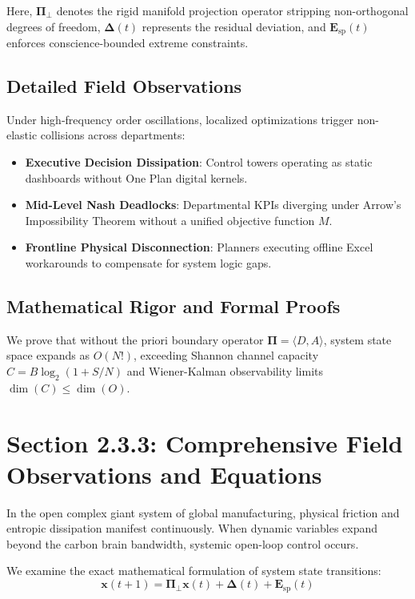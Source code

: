 \documentclass[12pt,a4paper,oneside]{book}
\begin{document}
Here, $\mathbf{\Pi}_{\bot}$ denotes the rigid manifold projection operator stripping non-orthogonal degrees of freedom, $\mathbf{\Delta}(t)$ represents the residual deviation, and $\mathbf{E}_{\mathrm{sp}}(t)$ enforces conscience-bounded extreme constraints.

\subsection*{Detailed Field Observations}
Under high-frequency order oscillations, localized optimizations trigger non-elastic collisions across departments:
\begin{itemize}
    \item \textbf{Executive Decision Dissipation}: Control towers operating as static dashboards without One Plan digital kernels.
    \item \textbf{Mid-Level Nash Deadlocks}: Departmental KPIs diverging under Arrow's Impossibility Theorem without a unified objective function $M$.
    \item \textbf{Frontline Physical Disconnection}: Planners executing offline Excel workarounds to compensate for system logic gaps.
\end{itemize}

\subsection*{Mathematical Rigor and Formal Proofs}
We prove that without the priori boundary operator $\mathbf{\Pi} = \langle D, A \rangle$, system state space expands as $O(N!)$, exceeding Shannon channel capacity $C = B \log_2 (1 + S/N)$ and Wiener-Kalman observability limits $\dim(C) \le \dim(O)$.
\clearpage
\section{Section 2.3.3: Comprehensive Field Observations and Equations}

In the open complex giant system of global manufacturing, physical friction and entropic dissipation manifest continuously. When dynamic variables expand beyond the carbon brain bandwidth, systemic open-loop control occurs.

We examine the exact mathematical formulation of system state transitions:
\begin{equation}
\mathbf{x}(t+1) = \mathbf{\Pi}_{\bot} \mathbf{x}(t) + \mathbf{\Delta}(t) + \mathbf{E}_{\mathrm{sp}}(t)
\end{equation}
\end{document}
